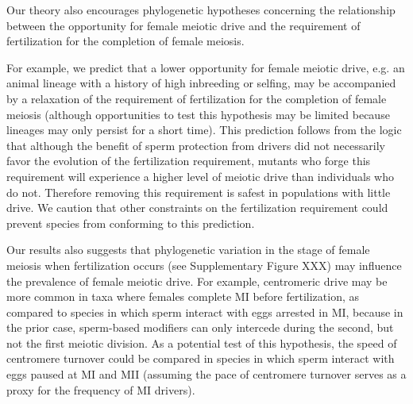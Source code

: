 \documentclass[12pt,letterpaper]{article}
\newcommand{\gc}[1]{{ \color{red} #1}}
\newcommand{\yb}[1]{{ \color{blue} #1}}
\begin{document}
Our theory also encourages phylogenetic hypotheses concerning the relationship between the opportunity 
	for female meiotic drive and the requirement of fertilization for the completion of female meiosis. 

\yb{
For example, we predict that a lower opportunity for female meiotic drive,
        e.g. an animal lineage with a history of high inbreeding or selfing, 
        may be accompanied by a relaxation of the requirement of fertilization for the
        completion of female meiosis (although 
        opportunities to test this hypothesis may be limited because 
        lineages may only persist for a short time). 
This prediction follows from the logic that although the benefit of sperm protection from drivers did not necessarily favor the evolution of the fertilization requirement, 
	mutants who forge this requirement will experience a higher level of meiotic drive than individuals who do not.  
Therefore removing this requirement is safest in populations with little drive. 
We caution that other constraints on the fertilization requirement could prevent species from conforming to this prediction.
}

 
Our results also suggests that phylogenetic variation in the stage of female meiosis when
        fertilization occurs \gc{(see Supplementary Figure XXX)} may influence the prevalence of  female meiotic drive.
For example, centromeric drive may be more common  in taxa where females complete MI before fertilization, 
	as compared to species in which sperm interact with eggs arrested  in MI, 
	because in the prior case, sperm-based modifiers can only intercede during the second, but not the first  meiotic division. 
As a potential test of this hypothesis, the speed of centromere
	turnover could be compared in species in which sperm interact with eggs paused at MI and MII 
	(assuming the pace of centromere turnover serves as a proxy for the frequency of MI drivers). 
\newline
\end{document}
